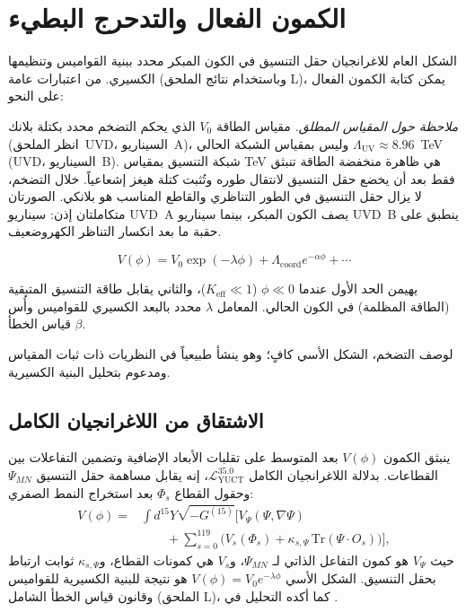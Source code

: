 \documentclass[12pt,a4paper]{article}
\newcommand{\Keff}{K_{\mathrm{eff}}}
\begin{document}
	\section{الكمون الفعال والتدحرج البطيء}
	\label{sec:potential}
	
	الشكل العام للاغرانجيان حقل التنسيق في الكون المبكر محدد ببنية القواميس وتنظيمها الكسيري. من اعتبارات عامة (وباستخدام نتائج الملحق L)، يمكن كتابة الكمون الفعال على النحو:
	
	\noindent\textit{ملاحظة حول المقياس المطلق.}
	مقياس الطاقة \(V_0\) الذي يحكم التضخم محدد بكتلة بلانك
	(انظر الملحق~UVD، السيناريو~A)، وليس بمقياس الشبكة الحالي
	\(\Lambda_{\mathrm{UV}} \approx 8.96\)~TeV (UVD، السيناريو~B).
	شبكة التنسيق بمقياس TeV هي ظاهرة منخفضة الطاقة تنبثق
	فقط بعد أن يخضع حقل التنسيق لانتقال طوره وتُثبت كتلة هيغز
	إشعاعياً. خلال التضخم، لا يزال حقل التنسيق في الطور التناظري
	والقاطع المناسب هو بلانكي. الصورتان متكاملتان إذن: سيناريو UVD~A
	يصف الكون المبكر، بينما سيناريو UVD~B ينطبق على حقبة
	ما بعد انكسار التناظر الكهروضعيف.
	
	\begin{equation}
		V(\phi) = V_0 \exp\left( -\lambda \phi \right) + \Lambda_{\mathrm{coord}} e^{-\alpha \phi} + \cdots
		\label{eq:potential}
	\end{equation}
	
	يهيمن الحد الأول عندما \(\phi \ll 0\) (\(\Keff \ll 1\))، والثاني يقابل طاقة التنسيق المتبقية (الطاقة المظلمة) في الكون الحالي. المعامل \(\lambda\) محدد بالبعد الكسيري للقواميس وأُس قياس الخطأ \(\beta\).
	
	لوصف التضخم، الشكل الأسي كافٍ؛ وهو ينشأ طبيعياً في النظريات ذات ثبات المقياس ومدعوم بتحليل البنية الكسيرية.
	
	\subsection{الاشتقاق من اللاغرانجيان الكامل}
	
	ينبثق الكمون \(V(\phi)\) بعد المتوسط على تقلبات الأبعاد الإضافية وتضمين التفاعلات بين القطاعات. بدلالة اللاغرانجيان الكامل \(\mathcal{L}_{\text{YUCT}}^{35.0}\)، إنه يقابل مساهمة حقل التنسيق \(\Psi_{MN}\) وحقول القطاع \(\Phi_s\) بعد استخراج النمط الصفري:
	\begin{align}
		V(\phi) = &\int d^{15}Y \sqrt{-G^{(15)}} \Big[ V_{\Psi}(\Psi,\nabla\Psi) \nonumber\\
		&\qquad + \sum_{s=0}^{119} \big( V_s(\Phi_s) + \kappa_{s,\Psi}\,\mathrm{Tr}(\Psi\cdot O_s) \big) \Big],
	\end{align}
	حيث \(V_{\Psi}\) هو كمون التفاعل الذاتي لـ \(\Psi_{MN}\)، و\(V_s\) هي كمونات القطاع، و\(\kappa_{s,\Psi}\) ثوابت ارتباط بحقل التنسيق. الشكل الأسي \(V(\phi)=V_0 e^{-\lambda\phi}\) هو نتيجة للبنية الكسيرية للقواميس وقانون قياس الخطأ الشامل (الملحق L)، كما أكده التحليل في \cite{Yakushev2026}.
	
\end{document}
